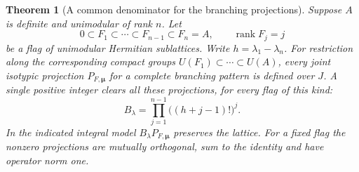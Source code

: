 \documentclass[a4paper,11pt]{article}
\newtheorem{theorem}[proposition]{Theorem}
\theoremstyle{definition}
\theoremstyle{remark}
\numberwithin{equation}{section}
\begin{document}
\begin{theorem}[A common denominator for the branching projections]\label{thm:proj}
Suppose \(A\) is definite and unimodular of rank \(n\). Let
\[
 0\subset F_1\subset\cdots\subset F_{n-1}\subset F_n=A,\qquad
                 \operatorname{rank}F_j=j
\]
be a flag of unimodular Hermitian sublattices. Write \(h=\lambda_1-\lambda_n\). For restriction along the corresponding compact groups \(U(F_1)\subset\cdots\subset U(A)\), every joint isotypic projection \(P_{F,\boldsymbol\mu}\) for a complete branching pattern is defined over \(J\). A single positive integer clears all these projections, for every flag of this kind:
\begin{equation}
         B_\lambda=\prod_{j=1}^{n-1}\big((h+j-1)!\big)^j .
         \label{eq:den}
\end{equation}
In the indicated integral model \(B_\lambda P_{F,\boldsymbol\mu}\) preserves the lattice. For a fixed flag the nonzero projections are mutually orthogonal, sum to the identity and have operator norm one.
\end{theorem}
\end{document}
